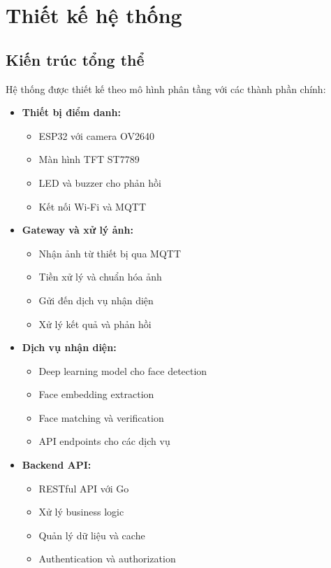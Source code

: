 \section{Thiết kế hệ thống}

\subsection{Kiến trúc tổng thể}
\hspace{0.5cm}Hệ thống được thiết kế theo mô hình phân tầng với các thành phần chính:

\begin{itemize}
    \item \textbf{Thiết bị điểm danh:}
    \begin{itemize}
        \item ESP32 với camera OV2640
        \item Màn hình TFT ST7789
        \item LED và buzzer cho phản hồi
        \item Kết nối Wi-Fi và MQTT
    \end{itemize}
    
    \item \textbf{Gateway và xử lý ảnh:}
    \begin{itemize}
        \item Nhận ảnh từ thiết bị qua MQTT
        \item Tiền xử lý và chuẩn hóa ảnh
        \item Gửi đến dịch vụ nhận diện
        \item Xử lý kết quả và phản hồi
    \end{itemize}
    
    \item \textbf{Dịch vụ nhận diện:}
    \begin{itemize}
        \item Deep learning model cho face detection
        \item Face embedding extraction
        \item Face matching và verification
        \item API endpoints cho các dịch vụ
    \end{itemize}
    
    \item \textbf{Backend API:}
    \begin{itemize}
        \item RESTful API với Go
        \item Xử lý business logic
        \item Quản lý dữ liệu và cache
        \item Authentication và authorization
    \end{itemize}
    

\end{itemize}
